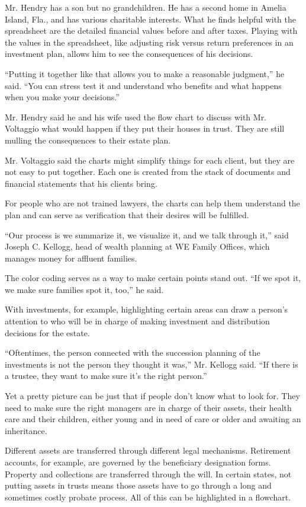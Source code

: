 Mr. Hendry has a son but no grandchildren. He has a second home in
Amelia Island, Fla., and has various charitable interests. What he finds
helpful with the spreadsheet are the detailed financial values before
and after taxes. Playing with the values in the spreadsheet, like
adjusting risk versus return preferences in an investment plan, allows
him to see the consequences of his decisions.

``Putting it together like that allows you to make a reasonable
judgment,'' he said. ``You can stress test it and understand who
benefits and what happens when you make your decisions.''

Mr. Hendry said he and his wife used the flow chart to discuss with Mr.
Voltaggio what would happen if they put their houses in trust. They are
still mulling the consequences to their estate plan.

Mr. Voltaggio said the charts might simplify things for each client, but
they are not easy to put together. Each one is created from the stack of
documents and financial statements that his clients bring.

For people who are not trained lawyers, the charts can help them
understand the plan and can serve as verification that their desires
will be fulfilled.

``Our process is we summarize it, we visualize it, and we talk through
it,'' said Joseph C. Kellogg, head of wealth planning at WE Family
Offices, which manages money for affluent families.

The color coding serves as a way to make certain points stand out. ``If
we spot it, we make sure families spot it, too,'' he said.

With investments, for example, highlighting certain areas can draw a
person's attention to who will be in charge of making investment and
distribution decisions for the estate.

``Oftentimes, the person connected with the succession planning of the
investments is not the person they thought it was,'' Mr. Kellogg said.
``If there is a trustee, they want to make sure it's the right person.''

Yet a pretty picture can be just that if people don't know what to look
for. They need to make sure the right managers are in charge of their
assets, their health care and their children, either young and in need
of care or older and awaiting an inheritance.

Different assets are transferred through different legal mechanisms.
Retirement accounts, for example, are governed by the beneficiary
designation forms. Property and collections are transferred through the
will. In certain states, not putting assets in trusts means those assets
have to go through a long and sometimes costly probate process. All of
this can be highlighted in a flowchart.

